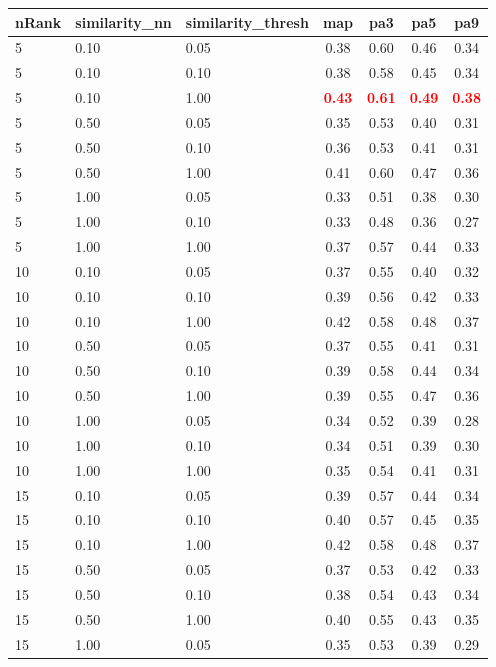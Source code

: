   
\begin{table} 
\begin{center} 
\scriptsize 
 \setlength{\tabcolsep}{.16667em} 
\begin{tabular}{lllcccc} 
nRank & similarity\_nn & similarity\_thresh & map & pa3 & pa5 & pa9 \\ 
\hline 
 5 & 0.10 & 0.05 & 0.38 & 0.60 & 0.46 & 0.34 \\ 
 5 & 0.10 & 0.10 & 0.38 & 0.58 & 0.45 & 0.34 \\ 
 5 & 0.10 & 1.00 & \textbf{\textcolor{red}{0.43}} & \textbf{\textcolor{red}{0.61}} & \textbf{\textcolor{red}{0.49}} & \textbf{\textcolor{red}{0.38}} \\ 
 5 & 0.50 & 0.05 & 0.35 & 0.53 & 0.40 & 0.31 \\ 
 5 & 0.50 & 0.10 & 0.36 & 0.53 & 0.41 & 0.31 \\ 
 5 & 0.50 & 1.00 & 0.41 & 0.60 & 0.47 & 0.36 \\ 
 5 & 1.00 & 0.05 & 0.33 & 0.51 & 0.38 & 0.30 \\ 
 5 & 1.00 & 0.10 & 0.33 & 0.48 & 0.36 & 0.27 \\ 
 5 & 1.00 & 1.00 & 0.37 & 0.57 & 0.44 & 0.33 \\ 
10 & 0.10 & 0.05 & 0.37 & 0.55 & 0.40 & 0.32 \\ 
10 & 0.10 & 0.10 & 0.39 & 0.56 & 0.42 & 0.33 \\ 
10 & 0.10 & 1.00 & 0.42 & 0.58 & 0.48 & 0.37 \\ 
10 & 0.50 & 0.05 & 0.37 & 0.55 & 0.41 & 0.31 \\ 
10 & 0.50 & 0.10 & 0.39 & 0.58 & 0.44 & 0.34 \\ 
10 & 0.50 & 1.00 & 0.39 & 0.55 & 0.47 & 0.36 \\ 
10 & 1.00 & 0.05 & 0.34 & 0.52 & 0.39 & 0.28 \\ 
10 & 1.00 & 0.10 & 0.34 & 0.51 & 0.39 & 0.30 \\ 
10 & 1.00 & 1.00 & 0.35 & 0.54 & 0.41 & 0.31 \\ 
15 & 0.10 & 0.05 & 0.39 & 0.57 & 0.44 & 0.34 \\ 
15 & 0.10 & 0.10 & 0.40 & 0.57 & 0.45 & 0.35 \\ 
15 & 0.10 & 1.00 & 0.42 & 0.58 & 0.48 & 0.37 \\ 
15 & 0.50 & 0.05 & 0.37 & 0.53 & 0.42 & 0.33 \\ 
15 & 0.50 & 0.10 & 0.38 & 0.54 & 0.43 & 0.34 \\ 
15 & 0.50 & 1.00 & 0.40 & 0.55 & 0.43 & 0.35 \\ 
15 & 1.00 & 0.05 & 0.35 & 0.53 & 0.39 & 0.29 \\ 

\end{tabular}
\end{center}
\end{table}

